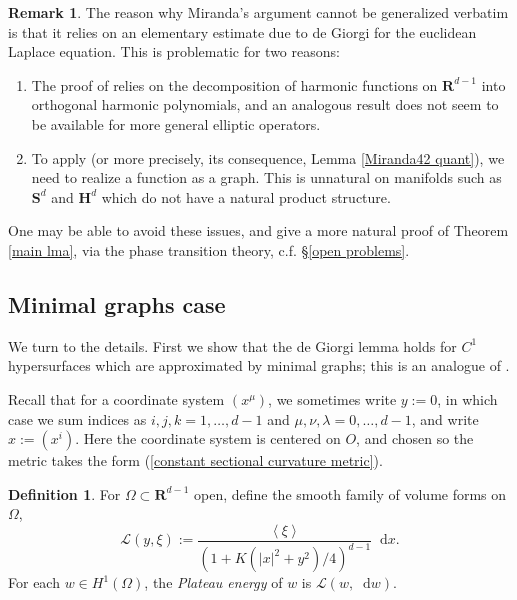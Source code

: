 \documentclass[reqno,10pt]{amsart}
\newcommand{\RR}{\mathbf{R}}
\newcommand{\Hyp}{\mathbf H}
\newcommand{\Sph}{\mathbf S}
\newcommand*\dif{\mathop{}\!\mathrm{d}}
\newcommand{\Lagrange}{\mathscr L}
\newcommand{\dfn}[1]{\emph{#1}\index{#1}}
\def\Japan#1{\left \langle #1 \right \rangle}
\theoremstyle{definition}
\newtheorem{definition}[theorem]{Definition}
\newtheorem{remark}[theorem]{Remark}
\numberwithin{equation}{section}
\begin{document}
\begin{remark}
The reason why Miranda's argument cannot be generalized verbatim is that it relies on an elementary estimate \cite[Lemma 4.1]{Miranda66} due to de Giorgi \cite{deGiorgi61} for the euclidean Laplace equation.
This is problematic for two reasons:

\begin{enumerate}
\item The proof of \cite[Lemma 4.1]{Miranda66} relies on the decomposition of harmonic functions on $\RR^{d - 1}$ into orthogonal harmonic polynomials, and an analogous result does not seem to be available for more general elliptic operators.
\item To apply \cite[Lemma 4.1]{Miranda66} (or more precisely, its consequence, Lemma \ref{Miranda42 quant}), we need to realize a function as a graph. This is unnatural on manifolds such as $\Sph^d$ and $\Hyp^d$ which do not have a natural product structure.
\end{enumerate}

One may be able to avoid these issues, and give a more natural proof of Theorem \ref{main lma}, via the phase transition theory, c.f. \S\ref{open problems}.
\end{remark}

\subsection{Minimal graphs case}
We turn to the details.
First we show that the de Giorgi lemma holds for $C^1$ hypersurfaces which are approximated by minimal graphs; this is an analogue of \cite[Teorema 4.3]{Miranda66}.

Recall that for a coordinate system $(x^\mu)$, we sometimes write $y := 0$, in which case we sum indices as $i, j, k = 1, \dots, d - 1$ and $\mu, \nu, \lambda = 0, \dots, d - 1$, and write $x := (x^i)$.
Here the coordinate system is centered on $O$, and chosen so the metric takes the form (\ref{constant sectional curvature metric}).

\begin{definition}
For $\Omega \subset \RR^{d - 1}$ open, define the smooth family of volume forms on $\Omega$,
$$\Lagrange(y, \xi) := \frac{\Japan{\xi}}{(1 + K(|x|^2 + y^2)/4)^{d - 1}} \dif x.$$
For each $w \in H^1(\Omega)$, the \dfn{Plateau energy} of $w$ is $\Lagrange(w, \dif w)$.
\end{definition}
\end{document}

